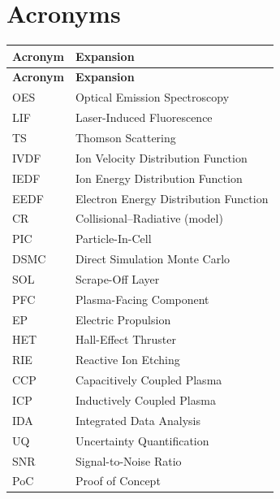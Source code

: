\section*{Acronyms}
\begin{longtable}{@{}p{2.6cm}p{11.6cm}@{}}
\toprule
\textbf{Acronym} & \textbf{Expansion} \\
\midrule
\endfirsthead
\toprule
\textbf{Acronym} & \textbf{Expansion} \\
\midrule
\endhead
\bottomrule
\endfoot
OES & Optical Emission Spectroscopy \\
LIF & Laser-Induced Fluorescence \\
TS & Thomson Scattering \\
IVDF & Ion Velocity Distribution Function \\
IEDF & Ion Energy Distribution Function \\
EEDF & Electron Energy Distribution Function \\
CR & Collisional--Radiative (model) \\
PIC & Particle-In-Cell \\
DSMC & Direct Simulation Monte Carlo \\
SOL & Scrape-Off Layer \\
PFC & Plasma-Facing Component \\
EP & Electric Propulsion \\
HET & Hall-Effect Thruster \\
RIE & Reactive Ion Etching \\
CCP & Capacitively Coupled Plasma \\
ICP & Inductively Coupled Plasma \\
IDA & Integrated Data Analysis \\
UQ & Uncertainty Quantification \\
SNR & Signal-to-Noise Ratio \\
PoC & Proof of Concept \\
\end{longtable}
\cleardoublepage

